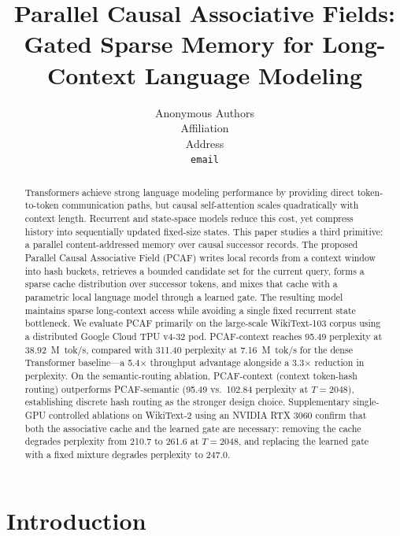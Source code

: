 \documentclass{article}
\title{Parallel Causal Associative Fields:\\
Gated Sparse Memory for Long-Context Language Modeling}
\author{Anonymous Authors \\
Affiliation \\
Address \\
\texttt{email}
}
\begin{document}
\maketitle

\begin{abstract}
Transformers achieve strong language modeling performance by providing direct
token-to-token communication paths, but causal self-attention scales
quadratically with context length. Recurrent and state-space models reduce this
cost, yet compress history into sequentially updated fixed-size states. This
paper studies a third primitive: a parallel content-addressed memory over causal
successor records. The proposed Parallel Causal Associative Field (PCAF) writes
local records from a context window into hash buckets, retrieves a bounded
candidate set for the current query, forms a sparse cache distribution over
successor tokens, and mixes that cache with a parametric local language model
through a learned gate. The resulting model maintains sparse long-context access
while avoiding a single fixed recurrent state bottleneck.
We evaluate PCAF primarily on the large-scale WikiText-103 corpus using a
distributed Google Cloud TPU v4-32 pod. PCAF-context reaches 95.49 perplexity
at 38.92~M~tok/s, compared with 311.40 perplexity at 7.16~M~tok/s for the
dense Transformer baseline---a 5.4$\times$ throughput advantage alongside a
3.3$\times$ reduction in perplexity. On the semantic-routing ablation,
PCAF-context (context token-hash routing) outperforms PCAF-semantic (95.49
vs.\ 102.84 perplexity at $T{=}2048$), establishing discrete hash routing as
the stronger design choice. Supplementary single-GPU controlled ablations on
WikiText-2 using an NVIDIA RTX 3060 confirm that both the associative cache and
the learned gate are necessary: removing the cache degrades perplexity from
210.7 to 261.6 at $T{=}2048$, and replacing the learned gate with a fixed
mixture degrades perplexity to 247.0.
\end{abstract}

\section{Introduction}
\end{document}
